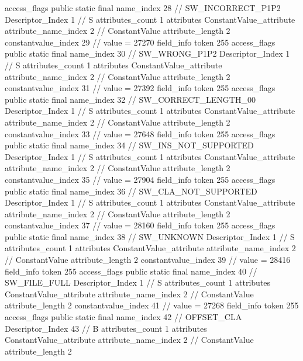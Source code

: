 {{{{{				access_flags	public static final
				name_index	28		// SW_INCORRECT_P1P2
				Descriptor_Index	1		// S
				attributes_count	1
				attributes {
				ConstantValue_attribute {
					attribute_name_index	2		// ConstantValue
					attribute_length	2
					constantvalue_index	29		// value = 27270
				}
				}
			}
			field_info {
				token	255
				access_flags	public static final
				name_index	30		// SW_WRONG_P1P2
				Descriptor_Index	1		// S
				attributes_count	1
				attributes {
				ConstantValue_attribute {
					attribute_name_index	2		// ConstantValue
					attribute_length	2
					constantvalue_index	31		// value = 27392
				}
				}
			}
			field_info {
				token	255
				access_flags	public static final
				name_index	32		// SW_CORRECT_LENGTH_00
				Descriptor_Index	1		// S
				attributes_count	1
				attributes {
				ConstantValue_attribute {
					attribute_name_index	2		// ConstantValue
					attribute_length	2
					constantvalue_index	33		// value = 27648
				}
				}
			}
			field_info {
				token	255
				access_flags	public static final
				name_index	34		// SW_INS_NOT_SUPPORTED
				Descriptor_Index	1		// S
				attributes_count	1
				attributes {
				ConstantValue_attribute {
					attribute_name_index	2		// ConstantValue
					attribute_length	2
					constantvalue_index	35		// value = 27904
				}
				}
			}
			field_info {
				token	255
				access_flags	public static final
				name_index	36		// SW_CLA_NOT_SUPPORTED
				Descriptor_Index	1		// S
				attributes_count	1
				attributes {
				ConstantValue_attribute {
					attribute_name_index	2		// ConstantValue
					attribute_length	2
					constantvalue_index	37		// value = 28160
				}
				}
			}
			field_info {
				token	255
				access_flags	public static final
				name_index	38		// SW_UNKNOWN
				Descriptor_Index	1		// S
				attributes_count	1
				attributes {
				ConstantValue_attribute {
					attribute_name_index	2		// ConstantValue
					attribute_length	2
					constantvalue_index	39		// value = 28416
				}
				}
			}
			field_info {
				token	255
				access_flags	public static final
				name_index	40		// SW_FILE_FULL
				Descriptor_Index	1		// S
				attributes_count	1
				attributes {
				ConstantValue_attribute {
					attribute_name_index	2		// ConstantValue
					attribute_length	2
					constantvalue_index	41		// value = 27268
				}
				}
			}
			field_info {
				token	255
				access_flags	public static final
				name_index	42		// OFFSET_CLA
				Descriptor_Index	43		// B
				attributes_count	1
				attributes {
				ConstantValue_attribute {
					attribute_name_index	2		// ConstantValue
					attribute_length	2
}}}}}}}
